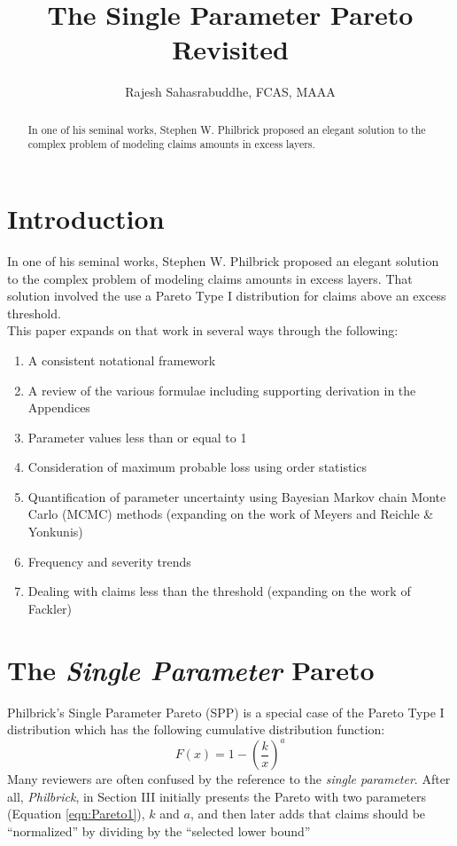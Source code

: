 \documentclass[]{article} %
\title{The Single Parameter Pareto Revisited}
\author{Rajesh Sahasrabuddhe, FCAS, MAAA}
\begin{document}
\maketitle

\begin{abstract}
In one of his seminal works, Stephen W. Philbrick proposed an elegant solution to the complex problem of modeling claims amounts in excess layers. 

\end{abstract}

\section{Introduction}
In one of his seminal works, Stephen W. Philbrick\cite{Philbrick} proposed an elegant solution to the complex problem of modeling claims amounts in excess layers. That solution involved the use a Pareto Type I distribution for claims above an excess threshold.\\

This paper expands on that work in several ways through the following:
\begin{enumerate}
	\item A consistent notational framework
	\item A review of the various formulae including supporting derivation in the Appendices
	\item Parameter values less than or equal to 1
	\item Consideration of maximum probable loss using order statistics
	\item Quantification of parameter uncertainty using Bayesian Markov chain Monte Carlo (MCMC) methods (expanding on the work of Meyers and Reichle \& Yonkunis)
	\item Frequency and severity trends
	\item Dealing with claims less than the threshold (expanding on the work of Fackler)
\end{enumerate}
\section{The \emph{Single Parameter} Pareto}
Philbrick's Single Parameter Pareto (SPP) is a special case of the Pareto Type I distribution which has the following cumulative distribution function:
\begin{equation}
F(x) = 1 - \left(\frac{k}{x} \right)^a\label{eqn:Pareto1}
\end{equation}
Many reviewers are often confused by the reference to the \emph{single parameter}. After all, \emph{Philbrick}, in Section III initially presents the Pareto with two parameters (Equation \ref{eqn:Pareto1}), $k$ and $a$, and then later adds that claims should be ``normalized'' by dividing by the ``selected lower bound''
\end{document}
